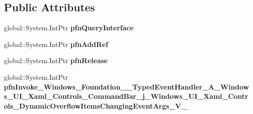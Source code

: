 \subsection*{Public Attributes}
\begin{DoxyCompactItemize}
\item 
\mbox{\label{struct_windows_1_1_foundation_1_1_typed_event_handler___a___windows___u_i___xaml___controls___co63bd2e5cd00e6ef40624678b07024809_af70022fc43bbf55291e4728f07023e15}} 
global\+::\+System.\+Int\+Ptr {\bfseries pfn\+Query\+Interface}
\item 
\mbox{\label{struct_windows_1_1_foundation_1_1_typed_event_handler___a___windows___u_i___xaml___controls___co63bd2e5cd00e6ef40624678b07024809_ada1ce4a48085b9af3ced2a91f6c5bc95}} 
global\+::\+System.\+Int\+Ptr {\bfseries pfn\+Add\+Ref}
\item 
\mbox{\label{struct_windows_1_1_foundation_1_1_typed_event_handler___a___windows___u_i___xaml___controls___co63bd2e5cd00e6ef40624678b07024809_abf77f6c9b3e9dac04ea6c9f06b9b78f7}} 
global\+::\+System.\+Int\+Ptr {\bfseries pfn\+Release}
\item 
\mbox{\label{struct_windows_1_1_foundation_1_1_typed_event_handler___a___windows___u_i___xaml___controls___co63bd2e5cd00e6ef40624678b07024809_a4f15f46b336d62331e4f61d688627940}} 
global\+::\+System.\+Int\+Ptr {\bfseries pfn\+Invoke\+\_\+\+Windows\+\_\+\+Foundation\+\_\+\+\_\+\+Typed\+Event\+Handler\+\_\+\+A\+\_\+\+Windows\+\_\+\+U\+I\+\_\+\+Xaml\+\_\+\+Controls\+\_\+\+Command\+Bar\+\_\+j\+\_\+\+Windows\+\_\+\+U\+I\+\_\+\+Xaml\+\_\+\+Controls\+\_\+\+Dynamic\+Overflow\+Items\+Changing\+Event\+Args\+\_\+\+V\+\_\+}
\end{DoxyCompactItemize}
